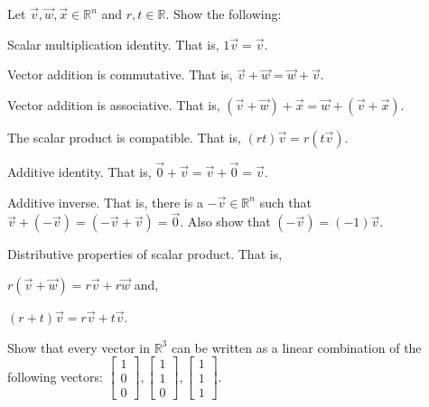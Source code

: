 \begin{exercise}
Let $\vec{v},\vec{w},\vec{x} \in \mathbb{R}^n$ and $r,t \in \mathbb{R}$. Show 
the following:\\
\begin{inparaenum}[a.)]
\item Scalar multiplication identity. That is, $1 \vec{v}=\vec{v}$.\\
\item Vector addition is commutative. That is, 
$\vec{v}+\vec{w}=\vec{w}+\vec{v}$.\\
\item Vector addition is associative. That is, 
$(\vec{v}+\vec{w})+\vec{x}=\vec{w}+(\vec{v}+\vec{x})$.\\
\item The scalar product is compatible. That is, $(rt) \vec{v}=r(t \vec{v})$.\\
\item Additive identity. That is, $\vec{0}+\vec{v}=\vec{v}+\vec{0}=\vec{v}$.\\
\item Additive inverse. That is, there is a $-\vec{v} \in \mathbb{R}^n$ such 
that $\vec{v}+(-\vec{v})=(-\vec{v}+\vec{v})=\vec{0}$. 
Also show that $(-\vec{v})=(-1)\vec{v}$. \\
\item Distributive properties of scalar product. That is, \\
\begin{inparaenum}[i.)]
\indent \item  $r(\vec{v}+\vec{w})=r\vec{v}+r\vec{w}$ and,\\
\indent \item  $(r+t)\vec{v}=r\vec{v}+t\vec{v}$.
\end{inparaenum}
\end{inparaenum} 
\end{exercise}


\begin{exercise}
Show that every vector in $\mathbb{R}^3$ can be written as a linear combination 
of the following vectors: $\begin{bmatrix}1\\ 0 \\ 0\end{bmatrix}, 
\begin{bmatrix}1\\ 1 \\ 0\end{bmatrix},\begin{bmatrix}1\\ 1 \\ 1\end{bmatrix}$.
\end{exercise}


